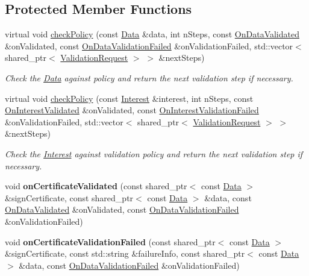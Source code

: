 \subsection*{Protected Member Functions}
\begin{DoxyCompactItemize}
\item 
virtual void \hyperlink{classndn_1_1ValidatorRegex_ac413d78b67fc3f5175613054486ed942}{check\+Policy} (const \hyperlink{classndn_1_1Data}{Data} \&data, int n\+Steps, const \hyperlink{namespacendn_aeaa15e849fd25636f59ca61acb64e532}{On\+Data\+Validated} \&on\+Validated, const \hyperlink{namespacendn_ae3c60219d74ba747e368708d93782760}{On\+Data\+Validation\+Failed} \&on\+Validation\+Failed, std\+::vector$<$ shared\+\_\+ptr$<$ \hyperlink{classndn_1_1ValidationRequest}{Validation\+Request} $>$ $>$ \&next\+Steps)
\begin{DoxyCompactList}\small\item\em Check the \hyperlink{classndn_1_1Data}{Data} against policy and return the next validation step if necessary. \end{DoxyCompactList}\item 
virtual void \hyperlink{classndn_1_1ValidatorRegex_a94094b94443fafd40a4add55b8ce6821}{check\+Policy} (const \hyperlink{classndn_1_1Interest}{Interest} \&interest, int n\+Steps, const \hyperlink{namespacendn_a90fe4b4d97a7870d87f2fce8fdc88f95}{On\+Interest\+Validated} \&on\+Validated, const \hyperlink{namespacendn_a6cb4f04de7c1e8da06d8f5865b3d2877}{On\+Interest\+Validation\+Failed} \&on\+Validation\+Failed, std\+::vector$<$ shared\+\_\+ptr$<$ \hyperlink{classndn_1_1ValidationRequest}{Validation\+Request} $>$ $>$ \&next\+Steps)
\begin{DoxyCompactList}\small\item\em Check the \hyperlink{classndn_1_1Interest}{Interest} against validation policy and return the next validation step if necessary. \end{DoxyCompactList}\item 
void {\bfseries on\+Certificate\+Validated} (const shared\+\_\+ptr$<$ const \hyperlink{classndn_1_1Data}{Data} $>$ \&sign\+Certificate, const shared\+\_\+ptr$<$ const \hyperlink{classndn_1_1Data}{Data} $>$ \&data, const \hyperlink{namespacendn_aeaa15e849fd25636f59ca61acb64e532}{On\+Data\+Validated} \&on\+Validated, const \hyperlink{namespacendn_ae3c60219d74ba747e368708d93782760}{On\+Data\+Validation\+Failed} \&on\+Validation\+Failed)\hypertarget{classndn_1_1ValidatorRegex_a16bed3a4c8e29ef99cd8330152a6bdba}{}\label{classndn_1_1ValidatorRegex_a16bed3a4c8e29ef99cd8330152a6bdba}

\item 
void {\bfseries on\+Certificate\+Validation\+Failed} (const shared\+\_\+ptr$<$ const \hyperlink{classndn_1_1Data}{Data} $>$ \&sign\+Certificate, const std\+::string \&failure\+Info, const shared\+\_\+ptr$<$ const \hyperlink{classndn_1_1Data}{Data} $>$ \&data, const \hyperlink{namespacendn_ae3c60219d74ba747e368708d93782760}{On\+Data\+Validation\+Failed} \&on\+Validation\+Failed)\hypertarget{classndn_1_1ValidatorRegex_a925643ac042866b0373a0c8e3c96a9de}{}\label{classndn_1_1ValidatorRegex_a925643ac042866b0373a0c8e3c96a9de}

\end{DoxyCompactItemize}
